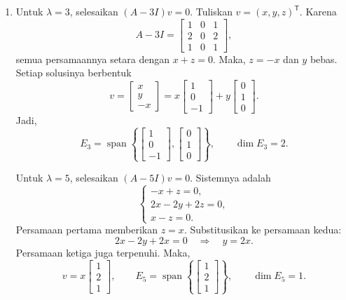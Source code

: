\documentclass[11pt,a4paper]{article}
\newcommand{\Span}{\operatorname{span}}
\begin{document}
\begin{enumerate}[itemsep=12pt,parsep=5pt]
\begin{enumerate}
          \item Untuk $\lambda=3$, selesaikan $(A-3I)v=0$.
                Tuliskan $v=(x,y,z)^{\mathsf T}$.
                Karena
                \[
                  A-3I=\begin{bmatrix}1&0&1\\2&0&2\\1&0&1\end{bmatrix},
                \]
                semua persamaannya setara dengan $x+z=0$.
                Maka, $z=-x$ dan $y$ bebas.
                Setiap solusinya berbentuk
                \[
                  v=\begin{bmatrix}x\\y\\-x\end{bmatrix}
                  =x\begin{bmatrix}1\\0\\-1\end{bmatrix}
                  +y\begin{bmatrix}0\\1\\0\end{bmatrix}.
                \]
                Jadi,
                \[
                  E_3=\Span\left\{
                  \begin{bmatrix}1\\0\\-1\end{bmatrix},
                  \begin{bmatrix}0\\1\\0\end{bmatrix}
                  \right\},\qquad\dim E_3=2.
                \]

                Untuk $\lambda=5$, selesaikan $(A-5I)v=0$.
                Sistemnya adalah
                \[
                  \begin{cases}
                    -x+z=0,     \\
                    2x-2y+2z=0, \\
                    x-z=0.
                  \end{cases}
                \]
                Persamaan pertama memberikan $z=x$.
                Substitusikan ke persamaan kedua:
                \[
                  2x-2y+2x=0\quad\Longrightarrow\quad y=2x.
                \]
                Persamaan ketiga juga terpenuhi.
                Maka,
                \[
                  v=x\begin{bmatrix}1\\2\\1\end{bmatrix},
                  \qquad
                  E_5=\Span\left\{\begin{bmatrix}1\\2\\1\end{bmatrix}\right\},
                  \qquad\dim E_5=1.
                \]


\end{enumerate}
\end{enumerate}
\end{document}
